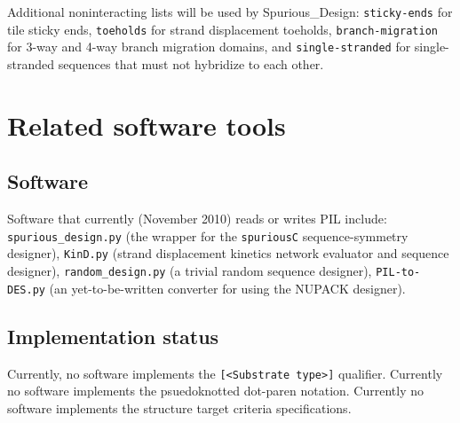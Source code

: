 \documentclass{article}
\begin{document}
Additional noninteracting lists will be used by Spurious\_Design:
\texttt{sticky-ends} for tile sticky ends, \texttt{toeholds} for
strand displacement toeholds, \texttt{branch-migration} for 3-way and
4-way branch migration domains, and \texttt{single-stranded} for
single-stranded sequences that must not hybridize to each other.


\section{Related software tools} \label{software}


\subsection{Software}

Software that currently (November 2010) reads or writes PIL include: 
  \texttt{spurious\_design.py} (the wrapper for the \texttt{spuriousC} sequence-symmetry designer),
  \texttt{KinD.py} (strand displacement kinetics network evaluator and sequence designer),
  \texttt{random\_design.py} (a trivial random sequence designer),
  \texttt{PIL-to-DES.py} (an yet-to-be-written converter for using the NUPACK designer).

\subsection{Implementation status}

Currently, no software implements the \texttt{[<Substrate type>]} qualifier.  Currently no software implements the psuedoknotted dot-paren notation.  Currently no software implements the structure target criteria specifications.
\end{document}
